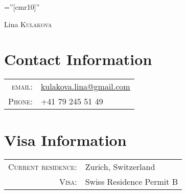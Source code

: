 \documentclass[a4paper,10pt]{article}
\begin{document}
\pagestyle{empty} %

\font\fb=''[cmr10]'' %

\par{ {\Huge Lina \textsc{Kulakova} }\bigskip\par}


\section{Contact Information}
\begin{tabular}{rl}
    \textsc{email:} & \href{mailto:kulakova.lina@gmail.com}{kulakova.lina@gmail.com} \\
    \textsc{Phone:} & +41 79 245 51 49 \\
\end{tabular}

\section{Visa Information}
\begin{tabular}{rl}
    \textsc{Current residence:} & Zurich, Switzerland \\
    \textsc{Visa:} & Swiss Residence Permit B
\end{tabular}

\end{document}
